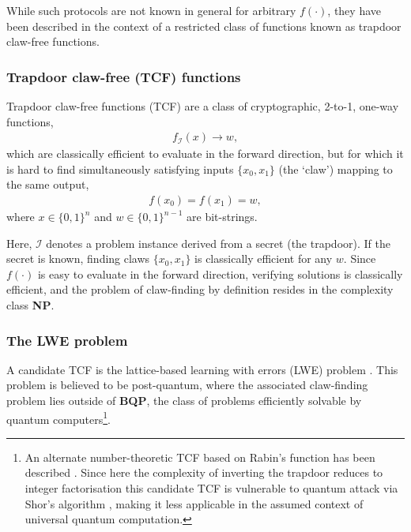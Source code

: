 \documentclass[twocolumn, aps, amsmath, amssymb, nofootinbib, superscriptaddress, longbibliography, floatfix, eqsecnum, rmp]{revtex4-2}
\begin{document}
While such protocols are not known in general for arbitrary $f(\cdot)$, they have been described in the context of a restricted class of functions known as trapdoor claw-free functions.

\subsubsection{Trapdoor claw-free (TCF) functions}

Trapdoor claw-free functions (TCF) are a class of cryptographic, 2-to-1, one-way functions,
\begin{align}
	f_\mathcal{I}(x)\to w,
\end{align}
which are classically efficient to evaluate in the forward direction, but for which it is hard to find simultaneously satisfying inputs $\{x_0,x_1\}$ (the `claw') mapping to the same output,
\begin{align}
	f(x_0)=f(x_1)=w,
\end{align}
where $x\in \{0,1\}^n$ and $w\in\{0,1\}^{n-1}$ are bit-strings.

Here, $\mathcal{I}$ denotes a problem instance derived from a secret (the trapdoor). If the secret is known, finding claws $\{x_0,x_1\}$ is classically efficient for any $w$. Since $f(\cdot)$ is easy to evaluate in the forward direction, verifying solutions is classically efficient, and the problem of  claw-finding by definition resides in the complexity class \textbf{NP}. %


\subsubsection{The LWE problem}

A candidate TCF is the lattice-based learning with errors (LWE) problem \cite{Goldwasser85, Regev09, Regev10}. This problem is believed to be post-quantum, where the associated claw-finding problem lies outside of \textbf{BQP}, the class of problems efficiently solvable by quantum computers\footnote{An alternate number-theoretic TCF based on Rabin's function has been described \cite{Rabin79, Goldwasser88}. Since here the complexity of inverting the trapdoor reduces to integer factorisation this candidate TCF is vulnerable to quantum attack via Shor's algorithm \cite{Shor97}, making it less applicable in the assumed context of universal quantum computation.}.
\end{document}
